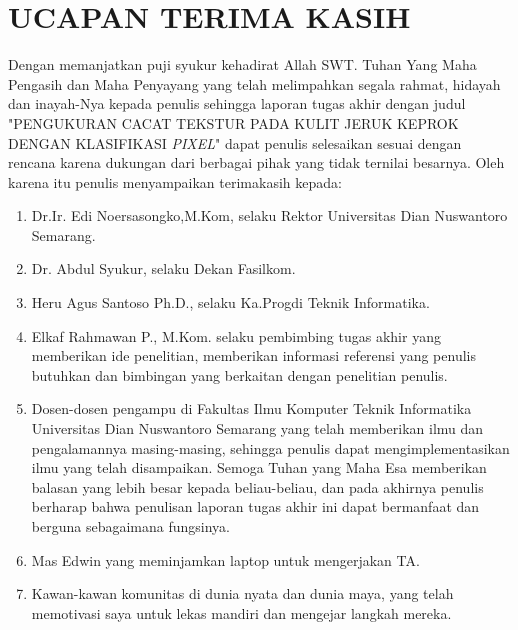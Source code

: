 \documentclass[laporan.tex]{subfiles}
\begin{document}
\chapter*{UCAPAN TERIMA KASIH}

Dengan memanjatkan puji syukur kehadirat Allah SWT. Tuhan Yang Maha Pengasih dan Maha Penyayang yang telah melimpahkan segala rahmat, hidayah dan inayah-Nya kepada penulis sehingga laporan tugas akhir dengan judul "PENGUKURAN CACAT TEKSTUR PADA KULIT JERUK KEPROK DENGAN KLASIFIKASI \emph{PIXEL}" dapat penulis selesaikan sesuai dengan rencana karena dukungan dari berbagai pihak yang tidak ternilai besarnya. Oleh karena itu penulis menyampaikan terimakasih kepada:
\begin{enumerate}
\item Dr.Ir. Edi Noersasongko,M.Kom, selaku Rektor Universitas Dian Nuswantoro Semarang.
\item Dr. Abdul Syukur, selaku Dekan Fasilkom.
\item Heru Agus Santoso Ph.D., selaku Ka.Progdi Teknik Informatika.
\item Elkaf Rahmawan P., M.Kom. selaku pembimbing tugas akhir yang memberikan ide penelitian, memberikan informasi referensi yang penulis butuhkan dan bimbingan yang berkaitan dengan penelitian penulis.
\item Dosen-dosen pengampu di Fakultas Ilmu Komputer Teknik Informatika Universitas Dian Nuswantoro Semarang yang telah memberikan ilmu dan pengalamannya masing-masing, sehingga penulis dapat mengimplementasikan ilmu yang telah disampaikan. Semoga Tuhan yang Maha Esa memberikan balasan yang lebih besar kepada beliau-beliau, dan pada akhirnya penulis berharap bahwa penulisan laporan tugas akhir ini dapat bermanfaat dan berguna sebagaimana fungsinya.
\item Mas Edwin yang meminjamkan laptop untuk mengerjakan TA.
\item Kawan-kawan komunitas di dunia nyata dan dunia maya, yang telah memotivasi saya untuk lekas mandiri dan mengejar langkah mereka.
\end{enumerate}
\end{document}
